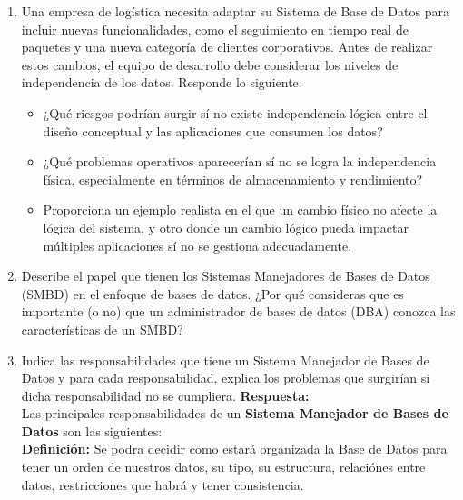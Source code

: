 \documentclass[12pt]{report}
\begin{document}
\begin{enumerate}[label=\textbf{\arabic*.}, leftmargin=*]
\begin{enumerate}[label=\textbf{\alph*.}, leftmargin=*, itemsep=1.0em]
\textbf{Recomendación}
Por lo que para una empresa en crecimiento que busca centralizar operaciones de ventas, clientes, inventario y logística, la mejor opción es \textbf{PostgreSQL}, ya que ofrece mayor capacidad de escalabilidad, solidez en el manejo de datos complejos y ausencia de costos de versiones empresariales o licencias. Por que hay que tener en cuenta que MySQL es adecuado para proyectos pequeños o con requerimientos menos complejos, pero PostgreSQL proporciona una base más robusta y preparada para el crecimiento a largo plazo.



\item Una empresa de log\'istica necesita adaptar su Sistema de Base de Datos para incluir nuevas funcionalidades, como el seguimiento en tiempo real de paquetes y una nueva categor\'ia de clientes corporativos. Antes de realizar estos cambios, el equipo de desarrollo debe considerar los niveles de independencia de los datos. Responde lo siguiente:
\begin{itemize}
  \item ¿Qu\'e riesgos podr\'ian surgir s\'i no existe independencia l\'ogica entre el dise\~no conceptual y las aplicaciones que consumen los datos?
  \item ¿Qu\'e problemas operativos aparecer\'ian s\'i no se logra la independencia f\'isica, especialmente en t\'erminos de almacenamiento y rendimiento?
  \item Proporciona un ejemplo realista en el que un cambio f\'isico no afecte la l\'ogica del sistema, y otro donde un cambio l\'ogico pueda impactar m\'ultiples aplicaciones s\'i no se gestiona adecuadamente.
\end{itemize}

\item Describe el papel que tienen los Sistemas Manejadores de Bases de Datos (SMBD) en el enfoque de bases de datos. ¿Por qu\'e consideras que es importante (o no) que un administrador de bases de datos (DBA) conozca las caracter\'isticas de un SMBD?

\item Indica las responsabilidades que tiene un Sistema Manejador de Bases de Datos y para cada responsabilidad, explica los problemas que surgir\'ian si dicha responsabilidad no se cumpliera.
\textbf{Respuesta:}\\
Las principales responsabilidades de un \textbf{Sistema Manejador de Bases de Datos} son las siguientes:\\
\textbf{Definición:} Se podra decidir como estará organizada la Base de Datos para tener un orden de nuestros datos, su tipo, su estructura, relaciónes entre datos, restricciones que habrá y tener consistencia.


\end{enumerate}
\end{enumerate}
\end{document}
